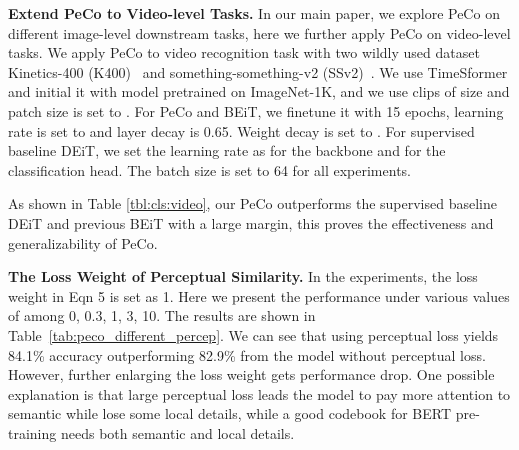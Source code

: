 \documentclass[letterpaper]{article} \usepackage{aaai23}  \usepackage{times}  \usepackage{helvet}  \usepackage{courier}  \usepackage[hyphens]{url}  \usepackage{graphicx} \urlstyle{rm} \def\UrlFont{\rm}  \usepackage{natbib}  \usepackage{caption} \frenchspacing  \setlength{\pdfpagewidth}{8.5in}  \setlength{\pdfpageheight}{11in}  \usepackage{algorithm}
\begin{document}
\noindent \textbf{Extend PeCo to Video-level Tasks.}
In our main paper, we explore PeCo on different image-level downstream tasks, here we further apply PeCo on video-level tasks. We apply PeCo to video recognition task with two wildly used dataset Kinetics-400 (K400)~\cite{kay2017kinetics} and something-something-v2 (SSv2)~\cite{goyal2017something}. We use TimeSformer and initial it with model pretrained on ImageNet-1K, and we use clips of size  and patch size is set to . For PeCo and BEiT, we finetune it with 15 epochs, learning rate is set to  and layer decay is 0.65. Weight decay is set to . For supervised baseline DEiT, we set the learning rate as  for the backbone and  for the classification head. The batch size is set to 64 for all experiments.

As shown in Table \ref{tbl:cls:video}, our PeCo outperforms the supervised baseline DEiT and previous BEiT with a large margin, this proves the effectiveness and generalizability of PeCo.

\begin{table}[h]
\centering
{}
\caption{Extend PeCo to video recognition task.}
\label{tbl:cls:video}
\end{table}

\noindent \textbf{The Loss Weight of Perceptual Similarity.}
In the experiments, the loss weight  in Eqn 5 is set as 1.
Here we present the performance under various values of  among 0, 0.3, 1, 3, 10.
The results are shown in Table~\ref{tab:peco_different_percep}.
We can see that using perceptual loss yields 84.1\% accuracy outperforming 82.9\% from the model without perceptual loss. 
However, further
enlarging the loss weight gets performance drop. 
One possible explanation is that large perceptual loss leads the model to pay more attention to semantic while lose some local details, while a good codebook for BERT pre-training needs both semantic and local details.
\end{document}
